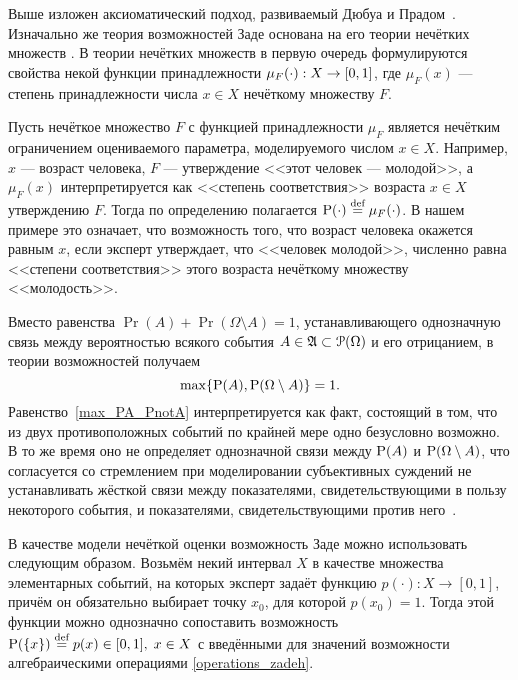 \begin{notice}
Выше изложен аксиоматический подход, развиваемый Дюбуа и Прадом~\cite{dubois_prade-1990}. Изначально же теория возможностей Заде основана на его теории нечётких множеств \cite{ZadehPrime}. В теории нечётких множеств в первую очередь формулируются свойства некой функции принадлежности $\mu_{F}(\cdot): X \rightarrow \zo$, где $\mu_F(x)$ --- степень принадлежности числа $x \in X$ нечёткому множеству $F$. 

Пусть нечёткое множество $F$ с функцией принадлежности $\mu_{F}$ является нечётким ограничением \cite{citeZadeh} оцениваемого параметра, моделируемого числом $x \in X$. Например, $x$ --- возраст человека, $F$ --- утверждение <<этот человек --- молодой>>, а $\mu_{F}(x)$ интерпретируется как <<степень соответствия>> возраста $x \in X$ утверждению $F$. Тогда по определению полагается $\P(\cdot) \defeq \mu_{F}(\cdot)$. В нашем примере это означает, что возможность того, что возраст человека окажется равным $x$, если эксперт утверждает, что <<человек молодой>>, численно равна <<степени соответствия>> этого возраста нечёткому множеству <<молодость>>. 
\end{notice}
\begin{notice}
Вместо равенства $\Pr(A) + \Pr(\Omega\setminus A) = 1$, устанавливающего однозначную связь между вероятностью всякого события $A\in\Alg \subset \Po(\Omega)$ и его отрицанием, в теории возможностей получаем
\begin{equation}
\label{max_PA_PnotA}
    \max\{\P(A), \P(\Omega\setminus A)\} = 1.
\end{equation}
Равенство~\eqref{max_PA_PnotA} интерпретируется как факт, состоящий в том, что из двух противоположных событий по крайней мере одно безусловно возможно. В то же время оно не определяет однозначной связи между $\P(A)$ и $\P(\Omega\setminus A)$, что согласуется со стремлением при моделировании субъективных суждений не устанавливать жёсткой связи между показателями, свидетельствующими в пользу некоторого события, и показателями, свидетельствующими против него~\cite{dubois_prade-1990}.
\end{notice}

\label{zadeh_fuzzy_asset_alg}
В качестве модели нечёткой оценки возможность Заде можно использовать следующим образом. Возьмём некий интервал $X$ в качестве множества элементарных событий, на которых эксперт задаёт функцию $p(\cdot): X \rightarrow [0,1]$, причём он обязательно выбирает точку $x_0$, для которой $p(x_0) = 1$. Тогда этой функции можно однозначно сопоставить возможность $\P(\{x\}) \define= p(x) \in \zo,\; x\in X$ с введёнными для значений возможности алгебраическими операциями \eqref{operations_zadeh}. 

